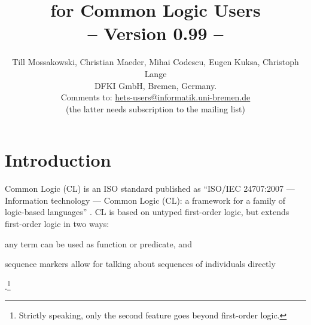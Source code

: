 \documentclass{article}
\newcommand{\LARGETEXTSC} [2]{{\LARGE     #1\large     #2}}
\newcommand{\LARGEHets} {\LARGETEXTSC{H}{ETS}\xspace}
\begin{document}
\title{{\bf \protect{\LARGEHets} for Common Logic Users}\\
-- Version 0.99 --}
\author{Till Mossakowski, Christian Maeder,
  Mihai Codescu, Eugen Kuksa, Christoph Lange\\[1em]
DFKI GmbH, Bremen, Germany.\\[1em]
Comments to: \href{mailto:hets-users@informatik.uni-bremen.de}{hets-users@informatik.uni-bremen.de} \\
(the latter needs subscription to the mailing list)
}

\maketitle

\setcounter{tocdepth}{1}
\tableofcontents

\section{Introduction}

Common Logic (CL) is an ISO standard published as ``ISO/IEC 24707:2007
--- Information technology — Common Logic (CL): a framework for a family
of logic-based languages'' \cite{CommonLogic:oldfashioned}. CL is based on untyped first-order
logic, but extends first-order logic in two ways: \begin{inparaenum}[(1)]\item any term can be
used as function or predicate, and \item sequence markers allow
for talking about sequences of individuals directly\end{inparaenum}.\footnote
{Strictly speaking, only the second feature goes beyond first-order
logic.}
\end{document}
